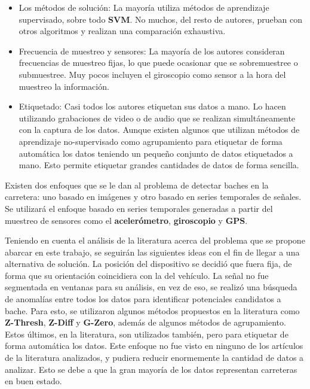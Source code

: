 \begin{itemize}
		\item Los métodos de solución: La mayoría utiliza métodos de aprendizaje supervisado, sobre todo \textbf{SVM}. No muchos, del resto de autores,
			prueban con otros algoritmos y realizan una comparación exhaustiva.

		\item Frecuencia de muestreo y sensores: La mayoría de los autores consideran frecuencias de muestreo fijas, lo que puede ocasionar que se
			sobremuestree o submuestree. Muy pocos incluyen el giroscopio como sensor a la hora del muestreo la información.

		\item Etiquetado: Casi todos los autores etiquetan sus datos a mano. Lo hacen utilizando grabaciones de video o de audio que se realizan 
			simultáneamente con la captura de los datos. Aunque existen algunos que utilizan métodos de aprendizaje no-supervisado como agrupamiento
			para etiquetar de forma automática los datos teniendo un pequeño conjunto de datos etiquetados a mano. Esto permite etiquetar grandes 
			cantidades de datos de forma sencilla.
	\end{itemize}

	Existen dos enfoques que se le dan al problema de detectar baches en la carretera: uno basado en imágenes y otro basado en series 
	temporales de señales. Se utilizará el enfoque basado en series temporales generadas a partir del muestreo de sensores como el
	\textbf{acelerómetro}, \textbf {giroscopio} y \textbf{GPS}.

	Teniendo en cuenta el análisis de la literatura acerca del problema que se propone abarcar en este trabajo, se seguirán las siguientes ideas con el 
	fin de llegar a una alternativa de solución. La posición del dispositivo se decidió que fuera fija, de forma que su orientación
	coincidiera con la del vehículo. La señal no fue segmentada en ventanas para su análisis, en vez de eso, se realizó una búsqueda de anomalías entre
	todos los datos para identificar potenciales candidatos a bache. Para esto, se utilizaron algunos métodos propuestos en la literatura como \textbf
	{Z-Thresh}, \textbf{Z-Diff} y \textbf{G-Zero}, además de algunos métodos de agrupamiento. Estos últimos, en la literatura, son utilizados también,
	pero para etiquetar de forma automática los datos. Este enfoque no fue visto en ninguno de los artículos de la literatura analizados, y pudiera reducir
	enormemente la cantidad de datos a analizar. Esto se debe a que la gran mayoría de los datos representan carreteras en buen estado.


